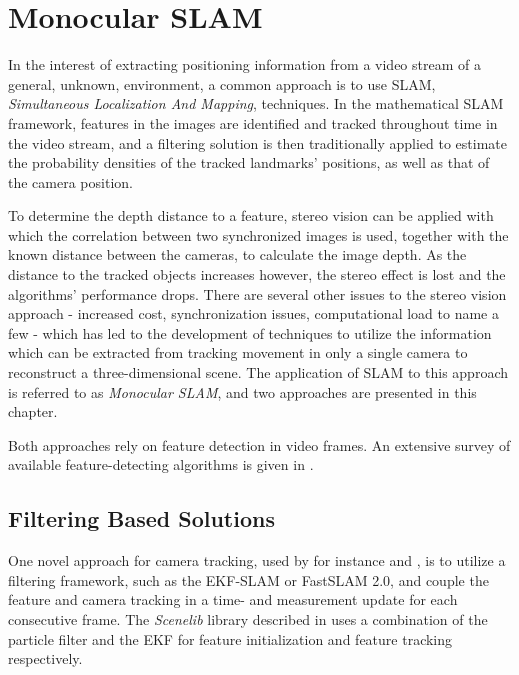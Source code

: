 \chapter{Monocular SLAM}
\label{cha:monoslam}
    In the interest of extracting positioning information from a video stream
    of a general, unknown, environment, a common approach is to use SLAM,
    \textit{Simultaneous Localization And Mapping}, techniques.
    In the mathematical SLAM framework, features in the images are identified
    and tracked throughout time in the video stream, and a filtering solution
    is then traditionally applied to estimate the probability densities
    of the tracked landmarks' positions, as well as that of the camera position.

    To determine the depth distance to a feature, stereo vision can be applied
    with which the correlation between two synchronized images is used, together with the known
    distance between the cameras, to calculate the image depth.
    As the distance to the tracked objects increases however, the stereo
    effect is lost and the algorithms' performance drops.
    There are several other issues to the stereo vision approach - increased
    cost, synchronization issues, computational load to name a few - which has
    led to the development of techniques to utilize the information which can be extracted
    from tracking movement in only a single camera to reconstruct a three-dimensional scene.
    The application of SLAM to this approach is referred to as \textit{Monocular SLAM},
    and two approaches are presented in this chapter.

    Both approaches rely on feature detection in video frames.
    An extensive survey of available feature-detecting algorithms
    is given in \citep{idris09reviewoffeaturedetection}.

    \section{Filtering Based Solutions}
        \label{sec:video:filtersolutions}
        One novel approach for camera tracking, used by for instance \citep{DBLP:conf/iccv/Davison03} and \citep{Eade:2006:SMS:1153170.1153506},
        is to utilize a filtering framework, such as the EKF-SLAM or FastSLAM 2.0,
        and couple the feature and camera tracking in a time- and measurement
        update for each consecutive frame.
        The \textit{Scenelib} library described in \citep{DBLP:conf/iccv/Davison03}
        uses a combination of the particle filter and the EKF for feature initialization
        and feature tracking respectively.

